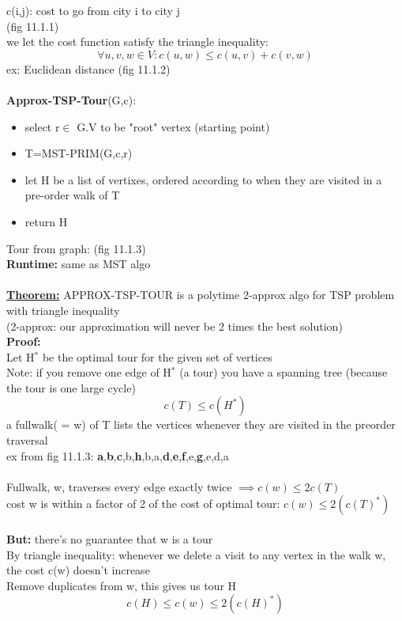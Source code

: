 \documentclass{article}
\begin{document}
	c(i,j): cost to go from city i to city j\\
	(fig 11.1.1)\\
	we let the cost function satisfy the triangle inequality:
	$$\forall u,v,w\in V: c(u,w)\le c(u,v) + c(v,w)$$
	ex: Euclidean distance (fig 11.1.2)\\\\
	\textbf{Approx-TSP-Tour}(G,c):
	\begin{itemize}
		\item select r$\in$ G.V	to be "root" vertex (starting point)
		\item T=MST-PRIM(G,c,r)
		\item let H be a list of vertixes, ordered according to when they are visited in a pre-order walk of T
		\item return H
	\end{itemize}
	Tour from graph: (fig 11.1.3)\\
	\textbf{Runtime:} same as MST algo\\\\
	\textbf{\underline{Theorem:}} APPROX-TSP-TOUR is a polytime 2-approx algo for TSP problem with triangle inequality\\
	(2-approx: our approximation will never be 2 times the best solution)\\
	\textbf{Proof:}\\
	Let H$^*$ be the optimal tour for the given set of vertices\\
	Note: if you remove one edge of H$^*$ (a tour) you have a spanning tree (because the tour is one large cycle)\\
	$$c(T) \le c(H^*)$$
	a fullwalk( = w) of T lists the vertices whenever they are visited in the preorder traversal\\
	ex from fig 11.1.3: \textbf{a},\textbf{b},\textbf{c},b,\textbf{h},b,a,\textbf{d},\textbf{e},\textbf{f},e,\textbf{g},e,d,a\\\\
	Fullwalk, w, traverses every edge exactly twice $\implies c(w) \le 2c(T)$\\
	cost w is within a factor of 2 of the cost of optimal tour: $c(w)\le 2(c(T)^*)$\\\\
	\textbf{But:} there's no guarantee that w is a tour\\
	By triangle inequality: whenever we delete a visit to any vertex in the walk w, the cost c(w) doesn't increase\\
	Remove duplicates from w, this gives us tour H
	$$c(H)\le c(w)\le 2(c(H)^*)$$
	
\end{document}
